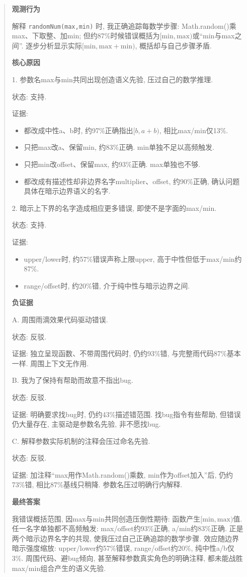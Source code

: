 \begin{quote}
\textbf{观测行为}

解释 \texttt{randomNum(max,min)} 时, 我正确追踪每数学步骤: Math.random()乘max、下取整、加min; 但约87\%时候错误概括为$[\mathrm{min},\mathrm{max})$或“min与max之间”. 逐步分析显示实际$[\mathrm{min},\mathrm{max}+\mathrm{min})$, 概括却与自己步骤矛盾.

\textbf{核心原因}

1. 参数名max与min共同出现创造语义先验, 压过自己的数学推理.

状态: 支持.

证据:
\begin{itemize}
\item 都改成中性a、b时, 约97\%正确指出$[b,a+b)$, 相比max/min仅13\%.
\item 只把max改a、保留min, 约83\%正确. min单独不足以高频触发.
\item 只把min改offset、保留max, 约93\%正确. max单独也不够.
\item 都改成有描述性却非边界名字multiplier、offset, 约90\%正确, 确认问题具体在暗示边界语义的名字.
\end{itemize}
2. 暗示上下界的名字造成相应更多错误, 即使不是字面的max/min.

状态: 支持.

证据:
\begin{itemize}
\item upper/lower时, 约57\%错误声称上限upper, 高于中性但低于max/min约87\%.
\item range/offset时, 约20\%错, 介于纯中性与暗示边界之间.
\end{itemize}
\textbf{负证据}

A. 周围雨滴效果代码驱动错误.

状态: 反驳.

证据: 独立呈现函数、不带周围代码时, 仍约93\%错, 与完整雨代码87\%基本一样. 周围上下文无作用.

B. 我为了保持有帮助而故意不指出bug.

状态: 反驳.

证据: 明确要求找bug时, 仍约43\%描述错范围. 找bug指令有些帮助, 但错误仍大量存在, 主驱动是参数名先验, 非不愿找bug.

C. 解释参数实际机制的注释会压过命名先验.

状态: 反驳.

证据: 加注释“max用作Math.random()乘数, min作为offset加入”后, 仍约73\%错, 相比87\%基线只稍降. 参数名压过明确行内解释.

\textbf{最终答案}

我错误概括范围, 因max与min共同创造压倒性期待: 函数产生$[\mathrm{min},\mathrm{max})$值. 任一名字单独都不高频触发: max/offset约93\%正确, a/min约83\%正确. 正是两个暗示边界名字的共现, 使我压过自己正确追踪的数学步骤. 效应随边界暗示强度缩放: upper/lower约57\%错误, range/offset约20\%, 纯中性a/b仅3\%. 周围代码、避bug倾向, 甚至解释参数真实角色的明确注释, 都未能战胜max/min组合产生的语义先验.
\end{quote}


